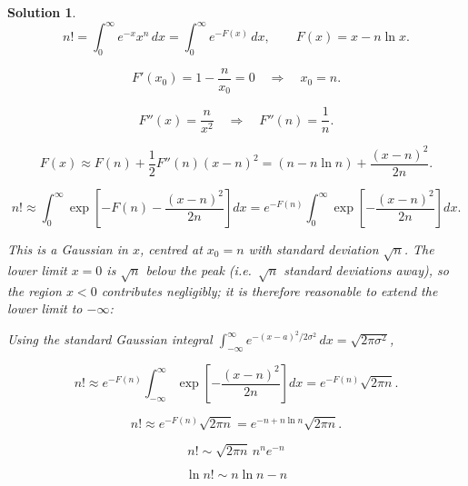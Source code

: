 \documentclass[11pt]{article}
\newtheorem*{solution}{Solution}
\begin{document}
\begin{solution}
\[
n! = \int_0^\infty e^{-x}x^n\,dx
= \int_0^\infty e^{-F(x)}\,dx,
\qquad
F(x)=x-n\ln x.
\]

\[
F'(x_0)=1-\frac{n}{x_0}=0
\quad\Rightarrow\quad
x_0=n.
\]

\[
F''(x)=\frac{n}{x^2}
\quad\Rightarrow\quad
F''(n)=\frac{1}{n}.
\]

\[
F(x)\approx F(n)+\frac{1}{2}F''(n)(x-n)^2
=
\left(n-n\ln n\right)
+\frac{(x-n)^2}{2n}.
\]

\[
n!\approx
\int_0^\infty
\exp\!\left[
-F(n)
-\frac{(x-n)^2}{2n}
\right]
dx
=
e^{-F(n)}
\int_0^\infty
\exp\!\left[
-\frac{(x-n)^2}{2n}
\right]
dx.
\]

This is a Gaussian in $x$, centred at $x_0=n$ with standard deviation $\sqrt{n}$.
The lower limit $x=0$ is $\sqrt{n}$ below the peak (i.e.\ $\sqrt{n}$ standard deviations away),
so the region $x<0$ contributes negligibly; it is therefore reasonable
to extend the lower limit to $-\infty$:

\begin{center}
\end{center}

Using the standard Gaussian integral $\displaystyle\int_{-\infty}^{\infty} e^{-(x-a)^2/2\sigma^2}\,dx=\sqrt{2\pi\sigma^2}$,

\[
n!\approx
e^{-F(n)}
\int_{-\infty}^{\infty}
\exp\!\left[
-\frac{(x-n)^2}{2n}
\right]
dx
=
e^{-F(n)}\sqrt{2\pi n}.
\]

\[
n! \approx e^{-F(n)}\sqrt{2\pi n} = e^{-n+n\ln n}\sqrt{2\pi n}.
\]

\[
\boxed{n! \sim \sqrt{2\pi n}\, n^n e^{-n}}
\]

\[
\boxed{\ln n! \sim n\ln n - n}
\]
\end{solution}
\end{document}
